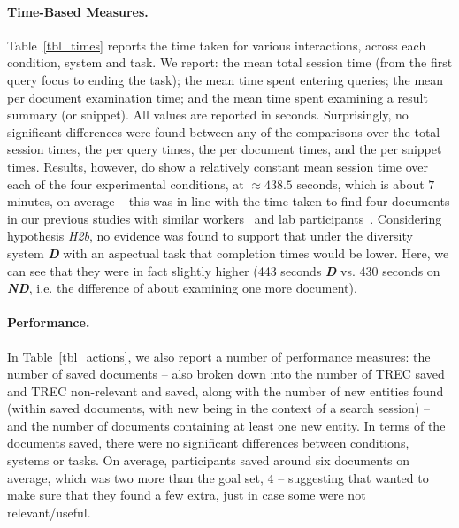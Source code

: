\paragraph{Time-Based Measures.} Table~\ref{tbl_times} reports the time taken for various interactions, across each condition, system and task. We report: the mean total session time (from the first query focus to ending the task); the mean time spent entering queries; the mean per document examination time; and the mean time spent examining a result summary (or snippet). All values are reported in seconds. Surprisingly, no significant differences were found between any of the comparisons over the total session times, the per query times, the per document times, and the per snippet times. Results, however, do show a relatively constant mean session time over each of the four experimental conditions, at $\approx438.5$ seconds, which is about $7$ minutes, on average -- this was in line with the time taken to find four documents in our previous studies with similar workers~ and lab participants~.
Considering hypothesis \emph{H2b}, no evidence was found to support that under the diversity system \textbf{\emph{D}} with an aspectual task that completion times would be lower. Here, we can see that they were in fact slightly higher (443 seconds \textbf{\emph{D}} vs. 430 seconds on \textbf{\emph{ND}}, i.e. the difference of about examining one more document). 

\paragraph{Performance.} In Table~\ref{tbl_actions}, we also report a number of performance measures: the number of saved documents -- also broken down into the number of TREC saved and TREC non-relevant and saved, along with the number of new entities found (within saved documents, with new being in the context of a search session) -- and the number of documents containing at least one new entity. In terms of the documents saved, there were no significant differences between conditions, systems or tasks. On average, participants saved around six documents on average, which was two more than the goal set, $4$ -- suggesting that wanted to make sure that they found a few extra, just in case some were not relevant/useful.

